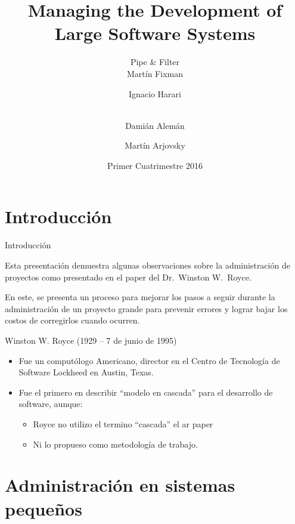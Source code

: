 \documentclass{beamer}
\title{Managing the Development of Large Software Systems}
\author[Pipe \& Filter]{%
	{\Large Pipe \& Filter} \\ \vspace{1em}
	Martín Fixman\inst{1} \and
	Ignacio Harari\inst{1} \and \\
	Damián Alemán\inst{1} \and
	Martín Arjovsky\inst{1}
}
\institute{\inst{1} Facultad de Ciencias Exactas y Naturales}
\date{Primer Cuatrimestre 2016}
\begin{document}
\begin{frame}[fragile]
\titlepage{}
\end{frame}

\section{Introducción}

\begin{frame}[fragile]{Introducción}

Esta presentación demuestra algunas observaciones sobre la administración de proyectos como presentado en el paper del {\large Dr.\ Winston W.\ Royce}\cite{royce70}.

\bigskip

En este, se presenta un proceso para mejorar los pasos a seguir durante la administración de un proyecto grande para prevenir errores y lograr bajar los costos de corregirlos cuando ocurren.

\end{frame}

\begin{frame}
Winston W. Royce (1929 – 7 de junio de 1995)

\begin{itemize}

\item Fue un computólogo Americano, director en el Centro de Tecnología de Software Lockheed en Austin, Texas.

\item Fue el primero en describir ``modelo en cascada'' para el desarrollo de software, aunque: 
\begin{itemize}
\item Royce no utilizo el termino ``cascada'' el ar paper
\item Ni lo propueso como metodología de trabajo.
\end{itemize}
\end{itemize}

\end{frame}


\section{Administración en sistemas pequeños}
\end{document}
